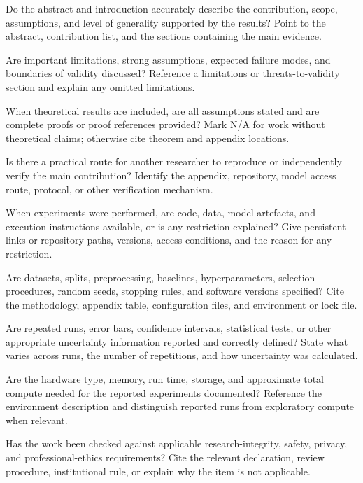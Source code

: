 \begin{reproducibilitychecklist}

{Do the abstract and introduction accurately describe the contribution, scope,
assumptions, and level of generality supported by the results?}
{Point to the abstract, contribution list, and the sections containing the main evidence.}

{Are important limitations, strong assumptions, expected failure modes, and
boundaries of validity discussed?}
{Reference a limitations or threats-to-validity section and explain any omitted limitations.}

{When theoretical results are included, are all assumptions stated and are
complete proofs or proof references provided?}
{Mark N/A for work without theoretical claims; otherwise cite theorem and appendix locations.}

{Is there a practical route for another researcher to reproduce or independently
verify the main contribution?}
{Identify the appendix, repository, model access route, protocol, or other verification mechanism.}

{When experiments were performed, are code, data, model artefacts, and execution
instructions available, or is any restriction explained?}
{Give persistent links or repository paths, versions, access conditions, and the reason for any restriction.}

{Are datasets, splits, preprocessing, baselines, hyperparameters, selection
procedures, random seeds, stopping rules, and software versions specified?}
{Cite the methodology, appendix table, configuration files, and environment or lock file.}

{Are repeated runs, error bars, confidence intervals, statistical tests, or
other appropriate uncertainty information reported and correctly defined?}
{State what varies across runs, the number of repetitions, and how uncertainty was calculated.}

{Are the hardware type, memory, run time, storage, and approximate total compute
needed for the reported experiments documented?}
{Reference the environment description and distinguish reported runs from exploratory compute when relevant.}

{Has the work been checked against applicable research-integrity, safety,
privacy, and professional-ethics requirements?}
{Cite the relevant declaration, review procedure, institutional rule, or explain why the item is not applicable.}


\end{reproducibilitychecklist}
